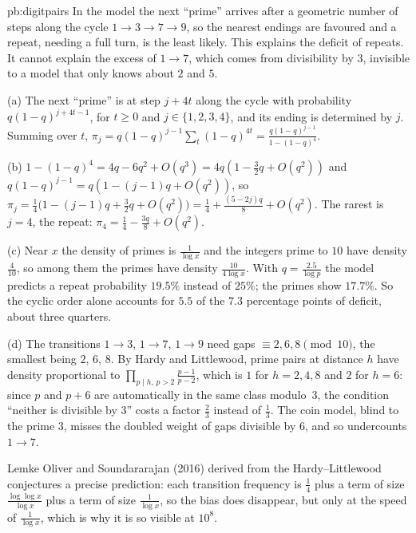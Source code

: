 \begin{solution}{pb:digitpairs}
\idea In the model the next ``prime'' arrives after a geometric number of steps along the cycle $1\to3\to7\to9$, so the nearest endings are favoured and a repeat, needing a full turn,
is the least likely. This explains the deficit of repeats. It cannot explain the excess of $1\to7$, which comes from divisibility by $3$, invisible to a model that only knows
about $2$ and $5$.

\writeup (a) The next ``prime'' is at step $j+4t$ along the cycle with probability $q(1-q)^{j+4t-1}$, for $t\ge0$ and $j\in\{1,2,3,4\}$, and its ending is determined by $j$.
Summing over $t$, $\pi_j=q(1-q)^{j-1}\sum_t(1-q)^{4t}=\frac{q(1-q)^{j-1}}{1-(1-q)^4}$.

(b) $1-(1-q)^4=4q-6q^2+O(q^3)=4q(1-\frac32q+O(q^2))$ and $q(1-q)^{j-1}=q(1-(j-1)q+O(q^2))$, so
$\pi_j=\frac14\bigl(1-(j-1)q+\frac32q+O(q^2)\bigr)=\frac14+\frac{(5-2j)q}8+O(q^2)$. The rarest is $j=4$, the repeat: $\pi_4=\frac14-\frac{3q}8+O(q^2)$.

(c) Near $x$ the density of primes is $\frac1{\log x}$ and the integers prime to $10$ have density $\frac4{10}$, so among them the primes have density $\frac{10}{4\log x}$. With $q=\frac{2.5}{\log p}$ the
model predicts a repeat probability $19.5\%$ instead of $25\%$; the primes show $17.7\%$. So the cyclic order alone accounts for $5.5$ of the $7.3$ percentage points of deficit, about three quarters.

(d) The transitions $1\to3$, $1\to7$, $1\to9$ need gaps $\equiv2,6,8\pmod{10}$, the smallest being $2$, $6$, $8$. By Hardy and Littlewood, prime pairs at distance $h$ have density
proportional to $\prod_{p\mid h,\,p>2}\frac{p-1}{p-2}$, which is $1$ for $h=2,4,8$ and $2$ for $h=6$: since $p$ and $p+6$ are automatically in the same class modulo~$3$, the condition
``neither is divisible by $3$'' costs a factor $\frac23$ instead of $\frac13$. The coin model, blind to the prime $3$, misses the doubled weight of gaps divisible by $6$, and so undercounts $1\to7$.

\leads Lemke Oliver and Soundararajan (2016) derived from the Hardy--Littlewood conjectures a precise prediction: each transition frequency is $\frac14$ plus a term of size
$\frac{\log\log x}{\log x}$ plus a term of size $\frac1{\log x}$, so the bias does disappear, but only at the speed of $\frac1{\log x}$, which is why it is so visible at $10^8$.
\end{solution}

